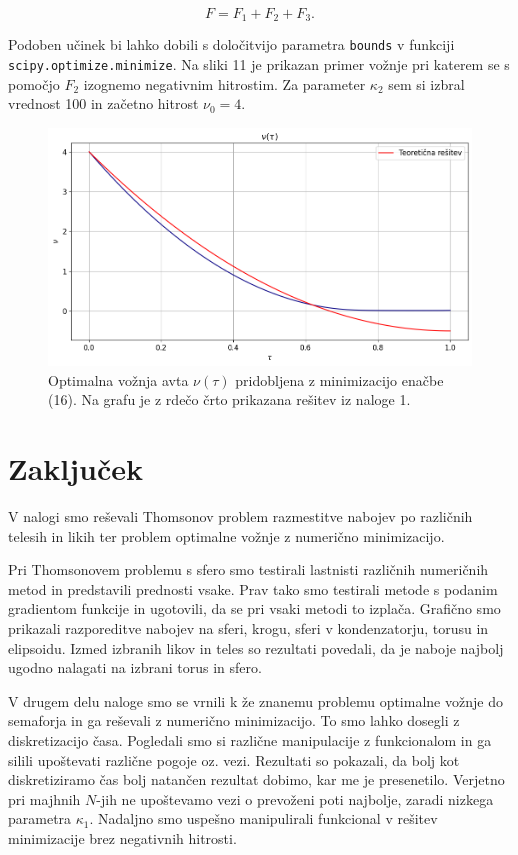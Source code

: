 \documentclass[slovene,11pt,a4paper]{article}
\begin{document}
\begin{equation}
F = F_1 + F_2 + F_3.
\end{equation}

Podoben učinek bi lahko dobili s določitvijo parametra \texttt{bounds} v funkciji \texttt{scipy.optimize.minimize}. Na sliki 11 je prikazan primer vožnje pri katerem se s pomočjo $F_2$ izognemo negativnim hitrostim. Za parameter $\kappa_2$ sem si izbral vrednost 100 in začetno hitrost $\nu_0 = 4$.

\begin{figure}[h!]
\centering
\includegraphics[width=12.5cm]{avto2.png}
\caption{Optimalna vožnja avta $\nu(\tau)$ pridobljena z minimizacijo enačbe (16). Na grafu je z rdečo črto prikazana rešitev iz naloge 1.}
\end{figure}

\section{Zaključek}

V nalogi smo reševali Thomsonov problem razmestitve nabojev po različnih telesih in likih ter problem optimalne vožnje z numerično minimizacijo.

Pri Thomsonovem problemu s sfero smo testirali lastnisti različnih numeričnih metod in predstavili prednosti vsake. Prav tako smo testirali metode s podanim gradientom funkcije in ugotovili, da se pri vsaki metodi to izplača. Grafično smo prikazali razporeditve nabojev na sferi, krogu, sferi v kondenzatorju, torusu in elipsoidu. Izmed izbranih likov in teles so rezultati povedali, da je naboje najbolj ugodno nalagati na izbrani torus in sfero.

V drugem delu naloge smo se vrnili k že znanemu problemu optimalne vožnje do semaforja in ga reševali z numerično minimizacijo. To smo lahko dosegli z diskretizacijo časa. Pogledali smo si različne manipulacije z funkcionalom in ga silili upoštevati različne pogoje oz. vezi. Rezultati so pokazali, da bolj kot diskretiziramo čas bolj natančen rezultat dobimo, kar me je presenetilo. Verjetno pri majhnih $N$-jih ne upoštevamo vezi o prevoženi poti najbolje, zaradi nizkega parametra $\kappa_1$. Nadaljno smo uspešno manipulirali funkcional v rešitev minimizacije brez negativnih hitrosti.
\end{document}
